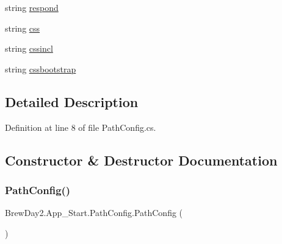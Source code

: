 \begin{DoxyCompactItemize}
\item 
string \mbox{\hyperlink{class_brew_day2_1_1_app___start_1_1_path_config_aecc7b14753d7109cfc6f692fce967a15}{respond}}
\item 
string \mbox{\hyperlink{class_brew_day2_1_1_app___start_1_1_path_config_a42fffff82a490a271c24e1ed653a3a80}{css}}
\item 
string \mbox{\hyperlink{class_brew_day2_1_1_app___start_1_1_path_config_a2ac410057d7c5e3adf252213728ef484}{cssincl}}
\item 
string \mbox{\hyperlink{class_brew_day2_1_1_app___start_1_1_path_config_aa4b95c73633f7f951977d4fd79f374cb}{cssbootstrap}}
\end{DoxyCompactItemize}


\subsection{Detailed Description}


Definition at line 8 of file Path\+Config.\+cs.



\subsection{Constructor \& Destructor Documentation}
\mbox{\label{class_brew_day2_1_1_app___start_1_1_path_config_a56b793372986bb2b8413e7fe095b808e}} 
\subsubsection{\texorpdfstring{Path\+Config()}{PathConfig()}}
{\footnotesize\ttfamily Brew\+Day2.\+App\+\_\+\+Start.\+Path\+Config.\+Path\+Config (\begin{DoxyParamCaption}{ }\end{DoxyParamCaption})}



